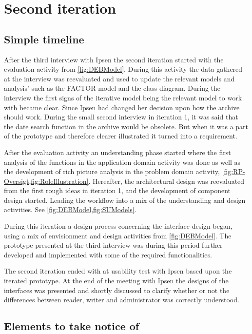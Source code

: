 \section{Second iteration}
\subsection{Simple timeline}\label{sec:2Iteration-timeline}
After the third interview with Ipsen the second iteration started with the evaluation activity from \cref{fig:DEBModel}. 
During this activity the data gathered at the interview was reevaluated and used to update the relevant models and analysis' such as the FACTOR model and the class diagram.
During the interview the first signs of the iterative model being the relevant model to work with became clear.
Since Ipsen had changed her decision upon how the archive should work.
 During the small second interview in iteration 1, it was said that the date search function in the archive would be obsolete.
But when it was a part of the prototype and therefore clearer illustrated it turned into a requirement.

After the evaluation activity an understanding phase started where the first analysis of the functions in the application domain activity was done as well as the development of rich picture analysis in the problem domain activity, \cref{fig:RP-Oversigt,fig:RoleIllustration}.
Hereafter, the architectural design was reevaluated from the first rough ideas in iteration 1, and the development of component design started.
Leading the workflow into a mix of the understanding and design activities. 
See \cref{fig:DEBModel,fig:SUModels}.

During this iteration a design process concerning the interface design began, using a mix of envisionment and design activities from \cref{fig:DEBModel}.
The prototype presented at the third interview was during this period further developed and implemented with some of the required functionalities.

The second iteration ended with at usability test with Ipsen based upon the iterated prototype. 
At the end of the meeting with Ipsen the designs of the interfaces was presented and shortly discussed to clarify whether or not the differences between reader, writer and administrator was correctly understood.

\subsection{Elements to take notice of}
